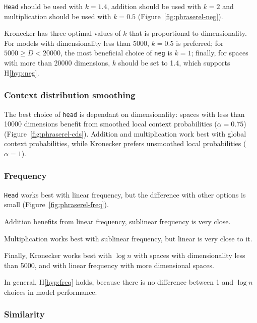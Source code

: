 \texttt{Head} should be used with $k = 1.4$, addition should be used with $k = 2$ and multiplication should be used with $k = 0.5$ (Figure~\ref{fig:phraserel-neg}).

Kronecker has three optimal values of $k$ that is proportional to dimensionality. For models with dimensionality less than 5000, $k = 0.5$ is preferred; for $5000 \geq D < 20000$, the most beneficial choice of \texttt{neg} is $k = 1$; finally, for spaces with more than 20000 dimensions, $k$ should be set to 1.4, which supports H\ref{hyp:neg}.

\subsubsection{Context distribution smoothing}
\label{sec:cont-distr-smooth-phraserel}

The best choice of \texttt{head} is dependant on dimensionality: spaces with less than 10000 dimensions benefit from smoothed local context probabilities ($\alpha = 0.75$) (Figure~\ref{fig:phraserel-cds}). Addition and multiplication work best with global context probabilities, while Kronecker prefers unsmoothed local probabilities ($\alpha = 1$).

\subsubsection{Frequency}
\label{sec:frequency-phraserel}



\texttt{Head} works best with linear frequency, but the difference with other options is small (Figure~\ref{fig:phraserel-freq}).

Addition benefits from linear frequency, sublinear frequency is very close.

Multiplication works best with sublinear frequency, but linear is very close to it.

Finally, Kronecker works best with $\log n$ with spaces with dimensionality less than 5000, and with linear frequency with more dimensional spaces.

In general, H\ref{hyp:freq} holds, because there is no difference between 1 and $\log n$ choices in model performance.

\subsubsection{Similarity}
\label{sec:similarity-phraserel}

